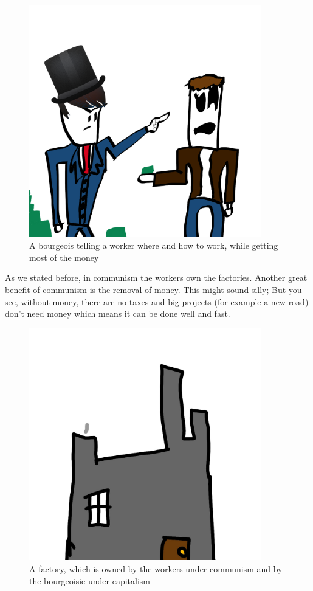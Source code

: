 \documentclass[a4paper]{book} %
\begin{document}
\begin{figure}[tbhp]
\centering
\includegraphics[width=0.9\textwidth]{2-1.png}
\caption{A bourgeois telling a worker where and how to work, while getting most of the money}
\end{figure}
  
  As we stated before, in communism the workers own the factories. Another great benefit of communism is the removal of money. This might sound silly; But you see, without money, there are no taxes and big projects (for example a new road) don't need money which means it can be done well and fast.

\begin{figure}[tbhp]
\centering
\includegraphics[width=0.9\textwidth]{2-3.png}
\caption{A factory, which is owned by the workers under communism and by the bourgeoisie under capitalism}
\end{figure}
\end{document}
